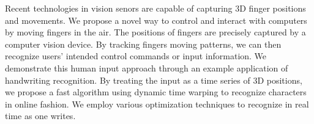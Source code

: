 Recent technologies in vision senors are capable of capturing 3D finger positions and movements. 
We propose a novel way to control and interact with computers by moving fingers in the air. The positions of fingers are precisely captured by a computer vision device. By tracking fingers moving patterns, we can then recognize users' intended control commands or input information.  We demonstrate this human input approach through an example application of handwriting recognition. 
By treating the input as a time series of 3D positions, 
we propose a fast algorithm using dynamic time warping to recognize characters in online fashion. We employ various optimization techniques to recognize in real time as one writes. 
